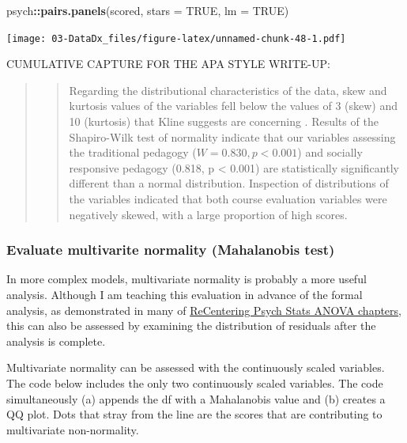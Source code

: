 \documentclass[
  11pt,
]{book}
\newenvironment{Shaded}{\begin{snugshade}}{\end{snugshade}}
\newcommand{\AttributeTok}[1]{\textcolor[rgb]{0.27,0.27,0.27}{#1}}
\newcommand{\ConstantTok}[1]{\textcolor[rgb]{0.37,0.37,0.37}{#1}}
\newcommand{\FunctionTok}[1]{\textcolor[rgb]{0.27,0.27,0.27}{\textbf{#1}}}
\newcommand{\NormalTok}[1]{#1}
\newcommand{\SpecialCharTok}[1]{\textcolor[rgb]{0.43,0.43,0.43}{\textbf{#1}}}
\begin{document}
\begin{Shaded}
\begin{Highlighting}[]
\NormalTok{psych}\SpecialCharTok{::}\FunctionTok{pairs.panels}\NormalTok{(scored, }\AttributeTok{stars =} \ConstantTok{TRUE}\NormalTok{, }\AttributeTok{lm =} \ConstantTok{TRUE}\NormalTok{)}
\end{Highlighting}
\end{Shaded}

\texttt{[image: 03-DataDx\_files/figure-latex/unnamed-chunk-48-1.pdf]}

CUMULATIVE CAPTURE FOR THE APA STYLE WRITE-UP:

\begin{quote}
\begin{quote}
Regarding the distributional characteristics of the data, skew and kurtosis values of the variables fell below the values of 3 (skew) and 10 (kurtosis) that Kline suggests are concerning \citeyearpar{kline_principles_2016}. Results of the Shapiro-Wilk test of normality indicate that our variables assessing the traditional pedagogy (\(W = 0.830, p < 0.001\)) and socially responsive pedagogy (0.818, p \textless{} 0.001) are statistically significantly different than a normal distribution. Inspection of distributions of the variables indicated that both course evaluation variables were negatively skewed, with a large proportion of high scores.
\end{quote}
\end{quote}

\hypertarget{evaluate-multivarite-normality-mahalanobis-test}{%
\subsubsection*{Evaluate multivarite normality (Mahalanobis test)}\label{evaluate-multivarite-normality-mahalanobis-test}}


In more complex models, multivariate normality is probably a more useful analysis. Although I am teaching this evaluation in advance of the formal analysis, as demonstrated in many of \href{https://lhbikos.github.io/ReCenterPsychStats/analysis-of-variance.html}{ReCentering Psych Stats ANOVA chapters}, this can also be assessed by examining the distribution of residuals after the analysis is complete.

Multivariate normality can be assessed with the continuously scaled variables. The code below includes the only two continuously scaled variables. The code simultaneously (a) appends the df with a Mahalanobis value and (b) creates a QQ plot. Dots that stray from the line are the scores that are contributing to multivariate non-normality.
\end{document}
